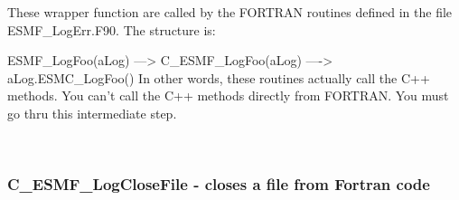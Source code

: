  
\setlength{\parskip}{0pt}
\setlength{\parindent}{0pt}
\setlength{\baselineskip}{11pt}
 
\def\bv{\begin{verbatim}}
\def\ev{\end{verbatim}}
\def\be{\begin{equation}}
\def\ee{\end{equation}}
\def\bea{\begin{eqnarray}}
\def\eea{\end{eqnarray}}
\def\bi{\begin{itemize}}
\def\ei{\end{itemize}}
\def\bn{\begin{enumerate}}
\def\en{\end{enumerate}}
\def\bd{\begin{description}}
\def\ed{\end{description}}
\def\({\left (}
\def\){\right )}
\def\[{\left [}
\def\]{\right ]}
\def\<{\left  \langle}
\def\>{\right \rangle}
\def\cI{{\cal I}}
\def\diag{\mathop{\rm diag}}
\def\tr{\mathop{\rm tr}}


 

   These wrapper function are called by the FORTRAN routines defined in the file 
   ESMF\_LogErr.F90.  The structure is:
    
      ESMF\_LogFoo(aLog) --->  C\_ESMF\_LogFoo(aLog)  ----> aLog.ESMC\_LogFoo()
   In other words, these routines actually call the C++ methods.  You can't call
   the C++ methods directly from FORTRAN.  You must go thru this intermediate step.
   
 
\mbox{}\hrulefill\ 
 
\subsubsection [C\_ESMF\_LogCloseFile] {C\_ESMF\_LogCloseFile - closes a file from Fortran code}


